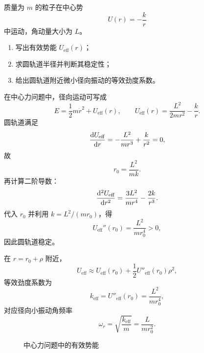 \begin{university}
质量为 $m$ 的粒子在中心势
\[
U(r)=-\frac{k}{r}
\]
中运动，角动量大小为 $L$。
\begin{enumerate}
  \item 写出有效势能 $U_{\text{eff}}(r)$；
  \item 求圆轨道半径并判断其稳定性；
  \item 给出圆轨道附近微小径向振动的等效劲度系数。
\end{enumerate}
\begin{solution}
在中心力问题中，径向运动可写成
\[
E=\frac12 m\dot r^2+U_{\text{eff}}(r),
\qquad
U_{\text{eff}}(r)=\frac{L^2}{2mr^2}-\frac{k}{r}.
\]
圆轨道满足
\[
\dv{U_{\text{eff}}}{r}= -\frac{L^2}{mr^3}+\frac{k}{r^2}=0,
\]
故
\[
r_0=\frac{L^2}{mk}.
\]
再计算二阶导数：
\[
\dv[2]{U_{\text{eff}}}{r}=\frac{3L^2}{mr^4}-\frac{2k}{r^3}.
\]
代入 $r_0$ 并利用 $k=L^2/(mr_0)$，得
\[
U_{\text{eff}}''(r_0)=\frac{L^2}{mr_0^4}>0,
\]
因此圆轨道稳定。

在 $r=r_0+\rho$ 附近，
\[
U_{\text{eff}}\approx U_{\text{eff}}(r_0)+\frac12 U''_{\text{eff}}(r_0)\rho^2,
\]
等效劲度系数为
\[
k_{\text{eff}}=U''_{\text{eff}}(r_0)=\frac{L^2}{mr_0^4},
\]
对应径向小振动角频率
\[
\omega_r=\sqrt{\frac{k_{\text{eff}}}{m}}=\frac{L}{mr_0^2}.
\]

\begin{figure}[H]
\centering
{}
\caption{中心力问题中的有效势能}
\end{figure}
\end{solution}
\end{university}

